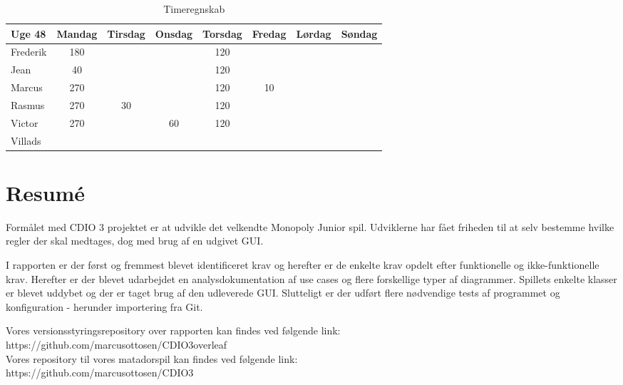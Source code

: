 \begin{table}[H]
\begin{tabular}{@{}lccccccc@{}}
\toprule
Uge 48   & Mandag & Tirsdag & Onsdag & Torsdag & Fredag & Lørdag & Søndag \\ \midrule
Frederik &  180  &    &    &120    &    &    &    \\
Jean     &  40  &    &    &   120 &    &    &    \\
Marcus   &  270 &    &    &  120  &  10  &    &    \\
Rasmus   &  270 &    30 &    &  120  &    &    &    \\
Victor   &  270 &    &  60  &  120  &    &    &    \\
Villads  &    &    &    &    &    &    &    \\ \bottomrule
\end{tabular}
\caption{Timeregnskab}
\end {table}

\clearpage


\section*{Resumé}

Formålet med CDIO 3 projektet er at udvikle det velkendte Monopoly Junior spil. Udviklerne har fået friheden til at selv bestemme hvilke regler der skal medtages, dog med brug af en udgivet GUI. 

I rapporten er der først og fremmest blevet identificeret krav og herefter er de enkelte krav opdelt efter funktionelle og ikke-funktionelle krav. Herefter er der blevet udarbejdet en analysdokumentation af use cases og flere forskellige typer af diagrammer. Spillets enkelte klasser er blevet uddybet og der er 
taget brug af den udleverede GUI. Slutteligt er der udført flere nødvendige tests af programmet og konfiguration - herunder importering fra Git. \\

\bigskip

Vores versionsstyringsrepository over rapporten kan findes ved følgende link:\\ https://github.com/marcusottosen/CDIO3overleaf\\

Vores repository til vores matadorspil kan findes ved følgende link:\\
https://github.com/marcusottosen/CDIO3




